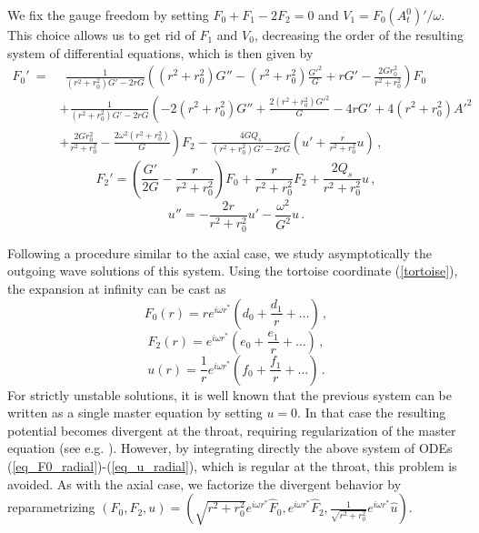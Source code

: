 \documentclass[11pt,a4paper]{article}
\begin{document}
We fix the gauge freedom by setting $F_0+F_1-2F_2=0$ and $V_1=F_0(A_t^{0})'/\omega$. 
This choice allows us to get rid of $F_1$ and $V_0$, decreasing the order of the resulting system of differential equations, which is then given by
%
\begin{equation}\label{eq_F0_radial}
\begin{split}
    F_0'\:= & \:\:\frac{1}{(r^2+r_0^2)G'-2rG}\left((r^2+r_0^2)G''-(r^2+r_0^2)\frac{G'^2}{G}+rG'-\frac{2Gr_0^2}{r^2+r_0^2}\right)F_0\\
    & +\frac{1}{(r^2+r_0^2)G'-2rG}\left(-2(r^2+r_0^2)G''+\frac{2(r^2+r_0^2)G'^2}{G}-4rG'+4(r^2+r_0^2)A'^2\right.\\
    & \left.+\frac{2Gr_0^2}{r^2+r_0^2}-\frac{2\omega^2(r^2+r_0^2)}{G}\right)F_2-\frac{4GQ_s}{(r^2+r_0^2)G'-2rG}\left(u'+\frac{r}{r^2+r_0^2}u\right) \,,
\end{split}
\end{equation}
%
\begin{equation}\label{eq_F2_radial}
    F_2'=\left(\frac{G'}{2G}-\frac{r}{r^2+r_0^2}\right)F_0+\frac{r}{r^2+r_0^2}F_2+\frac{2Q_s}{r^2+r_0^2}u \,,
\end{equation}
%
\begin{equation}\label{eq_u_radial}
    u''=-\frac{2r}{r^2+r_0^2}u'-\frac{\omega^2}{G^2}u \,.
\end{equation}

Following a procedure similar to the axial case, we study asymptotically the outgoing wave solutions of this system. Using the tortoise coordinate (\ref{tortoise}),
the expansion at infinity can be cast as
%
\begin{equation}
    F_0(r)=re^{i\omega r^*}\left(d_0+\frac{d_1}{r}+\dots\right) \,,
\end{equation}
%
\begin{equation}
    F_2(r)=e^{i\omega r^*}\left(e_0+\frac{e_1}{r}+\dots\right) \,,
\end{equation}
%
\begin{equation}
    u(r)=\frac{1}{r}e^{i\omega r^*}\left(f_0+\frac{f_1}{r}+\dots\right) \,.
\end{equation}
%
For strictly unstable solutions, it is well known that the previous system can be written as a single master equation by setting $u=0$.
In that case the resulting potential becomes divergent at the throat, requiring regularization of the master equation (see e.g. \cite{Gonzalez:2009hn, Bronnikov:2012ch, Torii:2013xba}). 
However, by integrating directly the above system of ODEs (\ref{eq_F0_radial})-(\ref{eq_u_radial}), which is regular at the throat, this problem is avoided. 
As with the axial case, we factorize the divergent behavior by reparametrizing $(F_0, F_2, u)=(\sqrt{r^2+r_0^2}e^{i\omega r^*}\hat{F}_0, e^{i\omega r^*}\hat{F}_2, \frac{1}{\sqrt{r^2+r_0^2}}e^{i\omega r^*}\hat{u})$.
\end{document}

